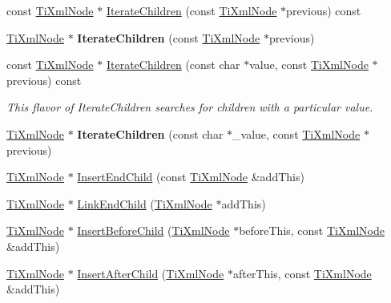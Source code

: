 \begin{DoxyCompactItemize}
const \hyperlink{classTiXmlNode}{Ti\+Xml\+Node} $\ast$ \hyperlink{classTiXmlNode_a67c3a02b797f08d9a31b2553661257e1}{Iterate\+Children} (const \hyperlink{classTiXmlNode}{Ti\+Xml\+Node} $\ast$previous) const
\item 
\mbox{\label{classTiXmlNode_a2358e747118fdbf0e467b1e4f7d03de1}} 
\hyperlink{classTiXmlNode}{Ti\+Xml\+Node} $\ast$ {\bfseries Iterate\+Children} (const \hyperlink{classTiXmlNode}{Ti\+Xml\+Node} $\ast$previous)
\item 
\mbox{\label{classTiXmlNode_a74bc68a536c279a42af346cb1454f143}} 
const \hyperlink{classTiXmlNode}{Ti\+Xml\+Node} $\ast$ \hyperlink{classTiXmlNode_a74bc68a536c279a42af346cb1454f143}{Iterate\+Children} (const char $\ast$value, const \hyperlink{classTiXmlNode}{Ti\+Xml\+Node} $\ast$previous) const
\begin{DoxyCompactList}\small\item\em This flavor of Iterate\+Children searches for children with a particular \textquotesingle{}value\textquotesingle{}. \end{DoxyCompactList}\item 
\mbox{\label{classTiXmlNode_a67ba8275e533e6f76340236c42ea0aea}} 
\hyperlink{classTiXmlNode}{Ti\+Xml\+Node} $\ast$ {\bfseries Iterate\+Children} (const char $\ast$\+\_\+value, const \hyperlink{classTiXmlNode}{Ti\+Xml\+Node} $\ast$previous)
\item 
\hyperlink{classTiXmlNode}{Ti\+Xml\+Node} $\ast$ \hyperlink{classTiXmlNode_af287a913ce46d8dbf7ef24fec69bbaf0}{Insert\+End\+Child} (const \hyperlink{classTiXmlNode}{Ti\+Xml\+Node} \&add\+This)
\item 
\hyperlink{classTiXmlNode}{Ti\+Xml\+Node} $\ast$ \hyperlink{classTiXmlNode_a1a881212554b759865f6cac79a851d38}{Link\+End\+Child} (\hyperlink{classTiXmlNode}{Ti\+Xml\+Node} $\ast$add\+This)
\item 
\hyperlink{classTiXmlNode}{Ti\+Xml\+Node} $\ast$ \hyperlink{classTiXmlNode_a71e54e393336382bc9875f64aab5cb15}{Insert\+Before\+Child} (\hyperlink{classTiXmlNode}{Ti\+Xml\+Node} $\ast$before\+This, const \hyperlink{classTiXmlNode}{Ti\+Xml\+Node} \&add\+This)
\item 
\hyperlink{classTiXmlNode}{Ti\+Xml\+Node} $\ast$ \hyperlink{classTiXmlNode_a274db3292218202805c093f66a964cb5}{Insert\+After\+Child} (\hyperlink{classTiXmlNode}{Ti\+Xml\+Node} $\ast$after\+This, const \hyperlink{classTiXmlNode}{Ti\+Xml\+Node} \&add\+This)

\end{DoxyCompactItemize}
